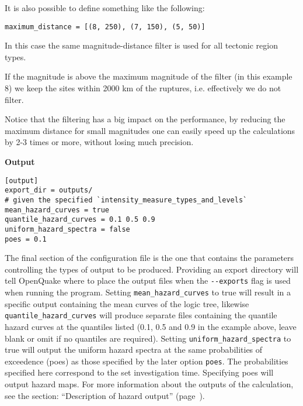It is also possible to define something like the following:

\begin{verbatim}
maximum_distance = [(8, 250), (7, 150), (5, 50)]
\end{verbatim}

In this case the same magnitude-distance filter is used for all tectonic
region types.

If the magnitude is above the maximum magnitude of the filter
(in this example 8) we keep the sites within 2000 km of the ruptures, i.e.
effectively we do not filter.

Notice that the filtering has a big impact on the performance, by
reducing the maximum distance for small magnitudes one can easily
speed up the calculations by 2-3 times or more, without losing much
precision.

\textbf{Output}

\begin{verbatim}
[output]
export_dir = outputs/
# given the specified `intensity_measure_types_and_levels`
mean_hazard_curves = true
quantile_hazard_curves = 0.1 0.5 0.9
uniform_hazard_spectra = false
poes = 0.1
\end{verbatim}

The final section of the configuration file is the one that contains the
parameters controlling the types of output to be produced. Providing an export
directory will tell OpenQuake where to place the output files when the
\texttt{-{}-exports} flag is used when running the program. Setting
\verb=mean_hazard_curves= to true will result in a specific output containing
the mean curves of the logic tree, likewise \verb=quantile_hazard_curves= will
produce separate files containing the quantile hazard curves at the quantiles
listed (0.1, 0.5 and 0.9 in the example above, leave blank or omit if no
quantiles are required). Setting \verb=uniform_hazard_spectra= to true will
output the uniform hazard spectra at the same probabilities of exceedence
(poes) as those specified by the later option \verb=poes=. The probabilities
specified here correspond to the set investigation time. Specifying poes
will output hazard maps. For more information about the outputs of the
calculation, see the section:
``Description of hazard output'' (page~\pageref{sec:hazard_outputs}).
